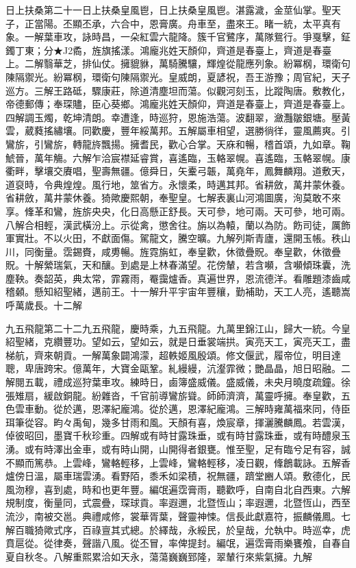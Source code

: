 \begin{pinyinscope}
日上扶桑第二十一日上扶桑皇風鬯，日上扶桑皇風鬯。湛露濊，金莖仙掌。聖天子，正當陽。丕顯丕承，六合中，恩膏廣。舟車至，盡來王。睹一統，太平真有象。一解葉車攻，詠時昌，一朵紅雲六龍降。簇千官鷺序，萬隊鴛行。爭戛擊，鉦鐲丁東；分★J2矞，旌旗搖漾。鴻龐兆姓天顏仰，齊道是春臺上，齊道是春臺上。二解翳華芝，排仙仗。擁貔貅，萬騎騰驤，輝煌從龍應列象。紛冪㭎，環衛句陳隔禦光。紛冪㭎，環衛句陳隔禦光。皇威朗，夏諺祝，吾王游豫；周官紀，天子巡方。三解王路砥，驟康莊，除道清塵坦而蕩。似觀河刻玉，比蹤陶唐。敷教化，帝德郵傳；奉琛贐，臣心葵鄉。鴻龐兆姓天顏仰，齊道是春臺上，齊道是春臺上。四解調玉燭，乾坤清朗。幸遭逢，時巡狩，恩施浩蕩。波翻翠，瀲灩皺銀塘。壓黃雲，葳蕤搖繡壤。同歡慶，豐年綏萬邦。五解屬車相望，選勝徜徉，靈風薦爽。引鸞旂，引鸞旂，轉龍旍飄揚。擁耆民，歡心合掌。天庥和暢，稽首頌，九如章。鞠鯱晉，萬年觴。六解乍洽宸襟延睿賞，喜遙臨，玉輅翠幌。喜遙臨，玉輅翠幌。康衢畔，擊壤交賡唱，聖壽無疆。億舜日，矢櫜弓韔，萬堯年，鳳舞麟翔。道敷天，道裒時，令典煌煌。風行地，筮省方。永懷柔，時邁其邦。省耕斂，萬井蒙休養。省耕斂，萬井蒙休養。猗歟慶熙朝，奉聖皇。七解表裏山河鴻圖廣，洵莫敢不來享。鞗革和鸞，旌旂央央，化日高懸正舒長。天可參，地可兩。天可參，地可兩。八解合相輕，漢武橫汾上。示從禽，懲舍往。旃以為轅，蘭以為防。飭司徒，厲飾軍實壯。不以火田，不獻面傷。駕龍文，騰空曠。九解列斯青廬，還開玉帳。秩山川，同衡量。霑錫賚，咸旉暢。旌霓旃虹，奉皇歡，休徵疊貺。奉皇歡，休徵疊貺。十解縈瑞氣，天和釀。到處是上林春滿望。花傍輦，若含嚬，含嚬傾珠囊，洗塵鞅。奏韶英，典太常，霏霧雨，罨靄爐香。真遍世界，恩流德洋。看雕題漆齒咸稽顙。懸知紹聖緒，邁前王。十一解升平宇宙年豐穰，勤補助，天工人亮，遙聽嵩呼萬歲長。十二解

九五飛龍第二十二九五飛龍，慶時乘，九五飛龍。九萬里錦江山，歸大一統。今皇紹聖緒，克纘豐功。望如云，望如云，就是日垂裳端拱。寅亮天工，寅亮天工，盡梯航，齊來朝貢。一解萬象闢鴻濛，超軼姬風殷頌。修文偃武，履帝位，明目達聰，卑唐跨宋。億萬年，大寶金甌鞏。糺縵縵，沆瀣霏微；艷晶晶，旭日昭融。二解閱五載，禮成巡狩葉車攻。練時日，鹵簿盛威儀。盛威儀，未央月曉度疏鐘。徐張雉扇，緩啟銅龍。紛雜沓，千官前導鸞旂聳。師師濟濟，萬靈呼擁。奉皇歡，五色雲車動。從於邁，恩澤紀龐鴻。從於邁，恩澤紀龐鴻。三解時雍萬福來同，侍臣珥筆從容。畇々禹甸，幾多甘雨和風。天顏有喜，煥宸章，揮灑騰麟鳳。若雲漢，倬彼昭回，墨寶千秋珍重。四解或有時甘露珠垂，或有時甘露珠垂，或有時醴泉玉湧。或有時澤出金車，或有時山開，山開得者銀甕。惟至聖，足有臨兮足有容，誠不顯而篤恭。上雲峰，鸞輅輕移，上雲峰，鸞輅輕移，凌日觀，鞗鶬載詠。五解香爐傍日溫，屬車瑞雲湧。看野陌，黍禾如梁積，祝無疆，躋堂豳人頌。敷德化，民風沕穆，喜到處，時和也更年豐。編氓遍霑膏雨，聽歡呼，自南自北自西東。六解規制度，衡量同，式震疊，琛球貢。率遐邇，北暨恆山；率遐邇，北暨恆山，西至流沙，南被交邕。典禮咸修，裳華胥葉，聲靈神悚。信長此獻嘉符，振麟儀鳳。七解百職猗歟式序，百祿亶其式總。於繹哉，永綏民，於皇哉，允執中。時巡幸，虎賁扈從。從律奏，聲諧八風。從丕冒，率俾提封。編氓，遍霑膏雨樂饔飧，自春自夏自秋冬。八解重熙累洽如天永，蕩蕩巍巍郅隆，翠輦行來紫氣擁。九解


\end{pinyinscope}
